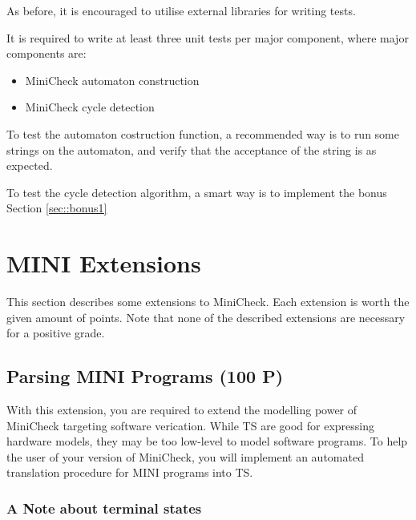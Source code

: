 \documentclass{article}
\begin{document}
As before, it is encouraged to utilise external libraries for writing tests.

It is required to write at least three unit tests per major component, where major components are:

\begin{itemize}
\item MiniCheck automaton construction
\item MiniCheck cycle detection
\end{itemize}

To test the automaton costruction function, a recommended way is to run some strings on the automaton, 
and verify that the acceptance of the string is as expected.

To test the cycle detection algorithm, a smart way is to implement the bonus Section \ref{sec::bonus1}

\section{MINI Extensions}
This section describes some extensions to MiniCheck. Each extension is worth the given amount of points. 
Note that none of the described extensions are necessary for a positive grade.

\subsection{Parsing MINI Programs (100 P)}
With this extension, you are required to extend the modelling power of MiniCheck targeting 
software verication. While TS are good for expressing hardware models, they may be too low-level 
to model software programs. To help the user of your version of MiniCheck, you will implement an 
automated translation procedure for MINI programs into TS.



\subsubsection*{A Note about terminal states}
\end{document}
